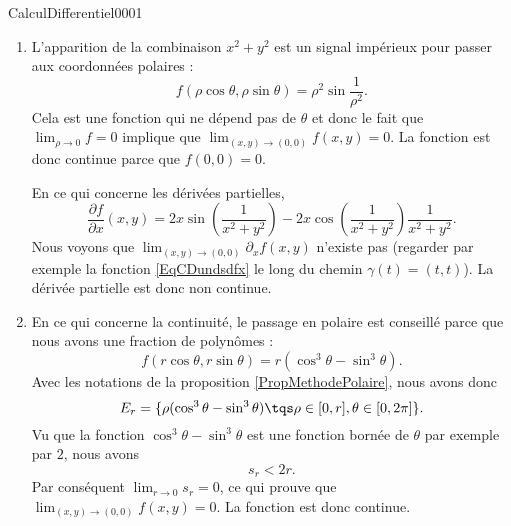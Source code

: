 \begin{corrige}{CalculDifferentiel0001}

	\begin{enumerate}
		\item
			L'apparition de la combinaison $x^2+y^2$ est un signal impérieux pour passer aux coordonnées polaires :
			\begin{equation}
				f(\rho\cos\theta,\rho\sin\theta)=\rho^2\sin\frac{1}{ \rho^2 }.
			\end{equation}
			Cela est une fonction qui ne dépend pas de $\theta$ et donc le fait que $\lim_{\rho\to 0}f=0$ implique que $\lim_{(x,y)\to(0,0)}f(x,y)=0$. La fonction est donc continue parce que $f(0,0)=0$.

			En ce qui concerne les dérivées partielles,
			\begin{equation}		\label{EqCDundsdfx}
				\frac{ \partial f }{ \partial x }(x,y)=2x\sin\left( \frac{1}{ x^2+y^2 } \right)-2x\cos\left( \frac{1}{ x^2+y^2 } \right)\frac{1}{ x^2+y^2 }.
			\end{equation}
			Nous voyons que $\lim_{(x,y)\to(0,0)}\partial_xf(x,y)$ n'existe pas (regarder par exemple la fonction \eqref{EqCDundsdfx} le long du chemin $\gamma(t)=(t,t)$). La dérivée partielle est donc non continue.
			
			
		\item
			En ce qui concerne la continuité, le passage en polaire est conseillé parce que nous avons une fraction de polynômes :
			\begin{equation}
				f(r\cos\theta,r\sin\theta)=r(\cos^3\theta-\sin^3\theta).
			\end{equation}
			Avec les notations de la proposition \ref{PropMethodePolaire}, nous avons donc
			\begin{equation}
				E_r=\{ \rho(\cos^3\theta-\sin^3\theta)\tqs \rho\in\mathopen[ 0 , r \mathclose],\theta\in\mathopen[ 0 , 2\pi \mathclose] \}.
			\end{equation}
			Vu que la fonction $\cos^3\theta-\sin^3\theta$ est une fonction bornée de $\theta$ par exemple par $2$, nous avons
			\begin{equation}
				s_r<2r.
			\end{equation}
			Par conséquent $\lim_{r\to 0} s_r=0$, ce qui prouve que $\lim_{(x,y)\to(0,0)}f(x,y)=0$. La fonction est donc continue.


\end{enumerate}
\end{corrige}

